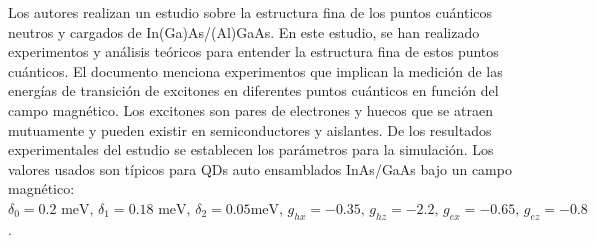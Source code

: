 \documentclass[../main.tex]{subfiles}
\begin{document}
Los autores \parencite{Bayer2002} realizan un estudio sobre la estructura fina de los puntos cuánticos neutros y cargados de  In(Ga)As/(Al)GaAs. En este estudio, se han realizado experimentos y análisis teóricos para entender la estructura fina de estos puntos cuánticos. El documento menciona experimentos que implican la medición de las energías de transición de excitones en diferentes puntos cuánticos en función del campo magnético. Los excitones son pares de electrones y huecos que se atraen mutuamente y pueden existir en semiconductores y aislantes. De los resultados experimentales del estudio se establecen los parámetros para la simulación. Los valores usados son típicos para QDs auto ensamblados InAs/GaAs bajo un campo magnético: $\delta_0 = 0.2 \text{ meV}, \, \delta_1 = 0.18 \text{ meV},\, \delta_2 = 0.05 \text{meV},\, g_{hx} = -0.35,\, g_{hz} = -2.2,\, g_{ex} = -0.65,\, g_{ez} = -0.8$.
\end{document}
